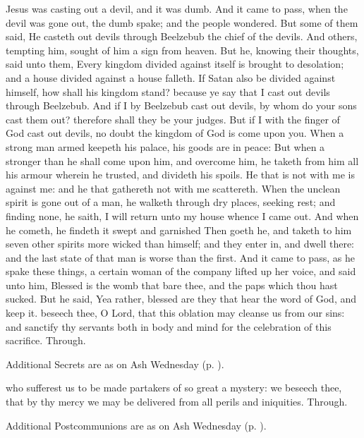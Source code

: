  Jesus was casting out a devil, and it was dumb. And it came to pass, when the devil was gone out, the dumb spake; and the people wondered. But some of them said, He casteth out devils through Beelzebub the chief of the devils. And others, tempting him, sought of him a sign from heaven. But he, knowing their thoughts, said unto them, Every kingdom divided against itself is brought to desolation; and a house divided against a house falleth. If Satan also be divided against himself, how shall his kingdom stand? because ye say that I cast out devils through Beelzebub. And if I by Beelzebub cast out devils, by whom do your sons cast them out? therefore shall they be your judges. But if I with the finger of God cast out devils, no doubt the kingdom of God is come upon you. When a strong man armed keepeth his palace, his goods are in peace: But when a stronger than he shall come upon him, and overcome him, he taketh from him all his armour wherein he trusted, and divideth his spoils. He that is not with me is against me: and he that gathereth not with me scattereth. When the unclean spirit is gone out of a man, he walketh through dry places, seeking rest; and finding none, he saith, I will return unto my house whence I came out. And when he cometh, he findeth it swept and garnished Then goeth he, and taketh to him seven other spirits more wicked than himself; and they enter in, and dwell there: and the last state of that man is worse than the first. And it came to pass, as he spake these things, a certain woman of the company lifted up her voice, and said unto him, Blessed is the womb that bare thee, and the paps which thou hast sucked. But he said, Yea rather, blessed are they that hear the word of God, and keep it.
\secret
{} beseech thee, O Lord, that this oblation may cleanse us from our sins: and sanctify thy servants both in body and mind for the celebration of this sacrifice. Through.
\begin{rubric}
    Additional Secrets are as on Ash Wednesday (p. \pageref{AshWednesdayMass}).
\end{rubric}
\postcommunion
{} who sufferest us to be made partakers of so great a mystery: we beseech thee, that by thy mercy we may be delivered from all perils and iniquities. Through.
\begin{rubric}
    Additional Postcommunions are as on Ash Wednesday (p. \pageref{AshWednesdayMass}).
\end{rubric}

